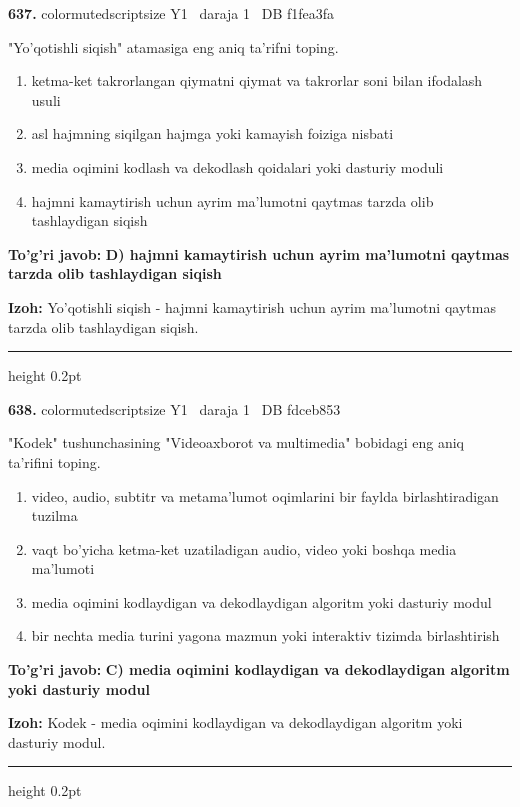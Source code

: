 \documentclass[10pt,a4paper,oneside]{article}
\begin{document}
\noindent\textbf{\color{ink}637.}  {color{muted}scriptsize Y1 \textbullet\ daraja 1 \textbullet\ DB f1fea3fa}
\par
"Yo'qotishli siqish" atamasiga eng aniq ta'rifni toping.
\begin{enumerate}[label=\Alph*),leftmargin=9mm]
\item ketma-ket takrorlangan qiymatni qiymat va takrorlar soni bilan ifodalash usuli
\item asl hajmning siqilgan hajmga yoki kamayish foiziga nisbati
\item media oqimini kodlash va dekodlash qoidalari yoki dasturiy moduli
\item hajmni kamaytirish uchun ayrim ma'lumotni qaytmas tarzda olib tashlaydigan siqish
\end{enumerate}
\begin{tcolorbox}[enhanced,breakable,colback=teal!4,colframe=teal!50!black,boxrule=0.5pt,arc=1.1mm,left=3mm,right=3mm,top=1.7mm,bottom=1.7mm,before skip=2mm,after skip=2mm]
\textbf{\color{teal}To'g'ri javob:} \textbf{D) hajmni kamaytirish uchun ayrim ma'lumotni qaytmas tarzda olib tashlaydigan siqish}
\par\smallskip
\textbf{Izoh:} Yo'qotishli siqish - hajmni kamaytirish uchun ayrim ma'lumotni qaytmas tarzda olib tashlaydigan siqish.
\end{tcolorbox}
\vspace{2mm}\hrule height 0.2pt \vspace{3mm}

\noindent\textbf{\color{ink}638.}  {color{muted}scriptsize Y1 \textbullet\ daraja 1 \textbullet\ DB fdceb853}
\par
"Kodek" tushunchasining "Videoaxborot va multimedia" bobidagi eng aniq ta'rifini toping.
\begin{enumerate}[label=\Alph*),leftmargin=9mm]
\item video, audio, subtitr va metama'lumot oqimlarini bir faylda birlashtiradigan tuzilma
\item vaqt bo'yicha ketma-ket uzatiladigan audio, video yoki boshqa media ma'lumoti
\item media oqimini kodlaydigan va dekodlaydigan algoritm yoki dasturiy modul
\item bir nechta media turini yagona mazmun yoki interaktiv tizimda birlashtirish
\end{enumerate}
\begin{tcolorbox}[enhanced,breakable,colback=teal!4,colframe=teal!50!black,boxrule=0.5pt,arc=1.1mm,left=3mm,right=3mm,top=1.7mm,bottom=1.7mm,before skip=2mm,after skip=2mm]
\textbf{\color{teal}To'g'ri javob:} \textbf{C) media oqimini kodlaydigan va dekodlaydigan algoritm yoki dasturiy modul}
\par\smallskip
\textbf{Izoh:} Kodek - media oqimini kodlaydigan va dekodlaydigan algoritm yoki dasturiy modul.
\end{tcolorbox}
\vspace{2mm}\hrule height 0.2pt \vspace{3mm}
\end{document}
